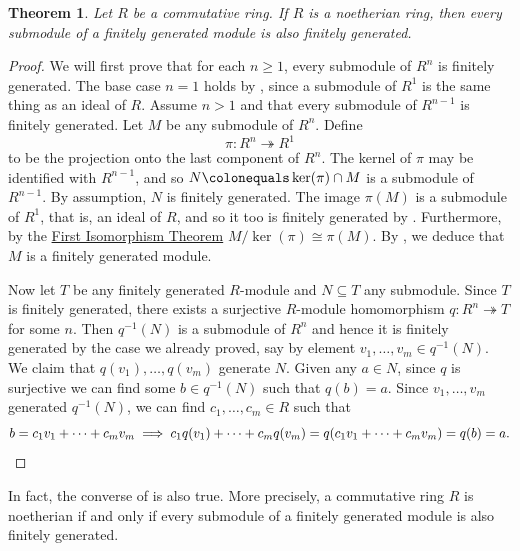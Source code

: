 \documentclass[12pt]{report}
\newtheorem{theorem}{Theorem}[chapter]
\numberwithin{equation}{section}
\numberwithin{theorem}{chapter}
\theoremstyle{definition}
\newtheorem*{basic properties}{Basic Properties}
\newtheorem*{Important Remark}{Important Remark}
\renewcommand{\ker}{\operatorname{ker}}
\begin{document}
\begin{theorem}\label{noeth submods of fg are fg}
Let $R$ be a commutative ring. If $R$ is a noetherian ring, then every submodule of a finitely generated module is also finitely generated.
\end{theorem}


\begin{proof}
We will first prove that for each $n \geqslant 1$, every submodule of $R^n$ is finitely generated. The base case $n=1$ holds by , since a submodule of $R^1$ is the same thing as an ideal of $R$.
Assume $n > 1$ and that every submodule of $R^{n-1}$ is finitely generated. Let $M$ be any submodule of $R^n$. Define
$$\pi\!: R^n \twoheadrightarrow R^1$$
to be the projection onto the last component of $R^n$. The kernel of $\pi$ may be identified with $R^{n-1}$, and so $N \colonequals \ker(\pi) \cap M$ is a submodule of $R^{n-1}$. By assumption, $N$ is finitely generated. The image $\pi(M)$ is a submodule of $R^1$, that is, an ideal of $R$, and so it too is finitely generated by . Furthermore, by the \hyperref[first iso thm]{First Isomorphism Theorem} $M/\ker(\pi)\cong \pi(M)$.
By , we deduce that $M$ is a finitely generated module.


Now let $T$ be any finitely generated $R$-module and $N \subseteq T$ any submodule. Since $T$ is finitely generated, there exists a surjective $R$-module homomorphism $q\!: R^n \twoheadrightarrow T$ for some $n$. Then $q^{-1}(N)$ is a submodule of $R^n$ and hence it is finitely generated by the case we already proved, say by element $v_1, \dots , v_m \in q^{-1}(N)$. We claim that $q(v_1), \dots, q(v_m)$ generate $N$. Given any $a \in N$, since $q$ is surjective we can find some $b \in q^{-1}(N)$ such that $q(b) = a$. Since $v_1, \ldots, v_m$ generated $q^{-1}(N)$, we can find $c_1, \ldots, c_m \in R$ such that
$$b = c_1 v_1 + \cdots + c_m v_m \implies c_1 q(v_1) + \cdots + c_m q(v_m) = q(c_1 v_1 + \cdots + c_m v_m) = q(b) = a.\qedhere$$ 
\end{proof}


In fact, the converse of  is also true. More precisely, a commutative ring $R$ is noetherian if and only if every submodule of a finitely generated module is also finitely generated.
\end{document}
